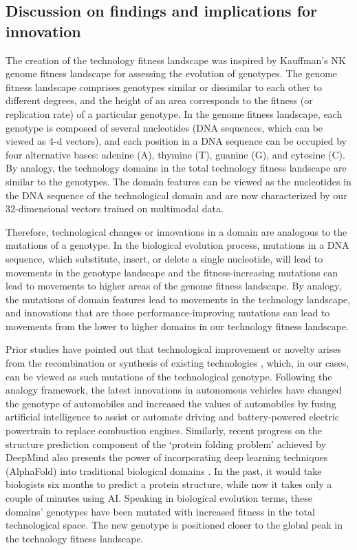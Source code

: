 \documentclass{article}
\begin{document}
\subsection{Discussion on findings and implications for innovation}

The creation of the technology fitness landscape was inspired by Kauffman’s NK genome fitness landscape for assessing the evolution of genotypes. The genome fitness landscape comprises genotypes similar or dissimilar to each other to different degrees, and the height of an area corresponds to the fitness (or replication rate) of a particular genotype. In the genome fitness landscape, each genotype is composed of several nucleotides (DNA sequences, which can be viewed as 4-d vectors), and each position in a DNA sequence can be occupied by four alternative bases: adenine (A), thymine (T), guanine (G), and cytosine (C). By analogy, the technology domains in the total technology fitness landscape are similar to the genotypes. The domain features can be viewed as the nucleotides in the DNA sequence of the technological domain and are now characterized by our 32-dimensional vectors trained on multimodal data. 

Therefore, technological changes or innovations in a domain are analogous to the mutations of a genotype. In the biological evolution process, mutations in a DNA sequence, which substitute, insert, or delete a single nucleotide, will lead to movements in the genotype landscape and the fitness-increasing mutations can lead to movements to higher areas of the genome fitness landscape. By analogy, the mutations of domain features lead to movements in the technology landscape, and innovations that are those performance-improving mutations can lead to movements from the lower to higher domains in our technology fitness landscape.

Prior studies have pointed out that technological improvement or novelty arises from the recombination or synthesis of existing technologies \cite{he2017novelty,he2019mining}, which, in our cases, can be viewed as such mutations of the technological genotype. Following the analogy framework, the latest innovations in autonomous vehicles have changed the genotype of automobiles and increased the values of automobiles by fusing artificial intelligence to assist or automate driving and battery-powered electric powertrain to replace combustion engines. Similarly, recent progress on the structure prediction component of the ‘protein folding problem’ achieved by DeepMind also presents the power of incorporating deep learning techniques (AlphaFold) into traditional biological domains \cite{jumper2021highly}. In the past, it would take biologists six months to predict a protein structure, while now it takes only a couple of minutes using AI. Speaking in biological evolution terms, these domains’ genotypes have been mutated with increased fitness in the total technological space. The new genotype is positioned closer to the global peak in the technology fitness landscape. 
\end{document}
